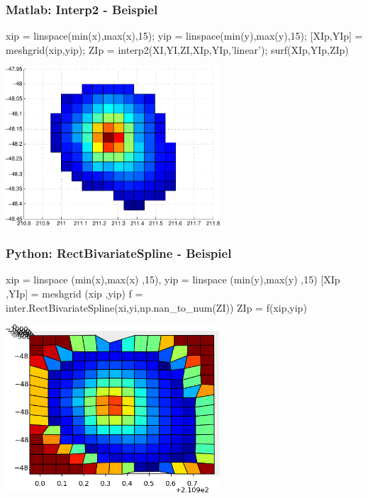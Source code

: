 \documentclass[hyperref={xetex}]{beamer}
\begin{document}
%
% 
\begin{frame}[fragile]\frametitle{Matlab: Interp2 - Beispiel}
\begin{matlabin}
xip = linspace(min(x),max(x),15); yip = linspace(min(y),max(y),15);
[XIp,YIp] = meshgrid(xip,yip);
ZIp = interp2(XI,YI,ZI,XIp,YIp,'linear');
surf(XIp,YIp,ZIp)
\end{matlabin}
\begin{center}
\includegraphics[width=0.6\textwidth]{figures/beispiel_interp2_plot}
\end{center}
\end{frame}

%
\begin{frame}[fragile]\frametitle{Python: RectBivariateSpline - Beispiel}
\begin{pyin}
xip = linspace (min(x),max(x) ,15), yip = linspace (min(y),max(y) ,15)
[XIp ,YIp] = meshgrid (xip ,yip)
f = inter.RectBivariateSpline(xi,yi,np.nan_to_num(ZI))
ZIp = f(xip,yip)
\end{pyin}
\begin{center}
\includegraphics[width=0.6\textwidth]{figures/beispiel_rectspline_py}
\end{center}
\end{frame}
\end{document}
